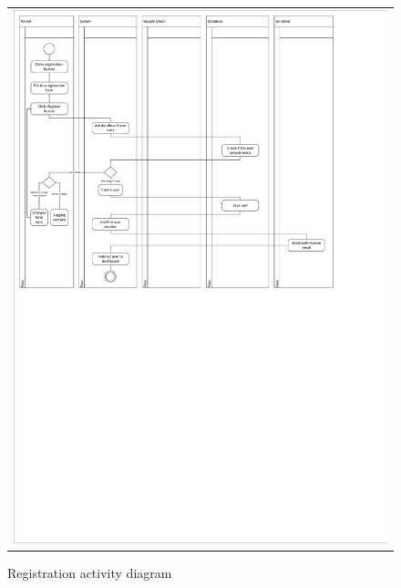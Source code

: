 \documentclass{sprawozdanie-agh}
\begin{document}
			\begin{figure}[H]
				\centering
				\begin{tabular}{c}
					\includegraphics[width=.95\textwidth]{cropped_Registration_Activity_Diagram} 
				\end{tabular}
			\caption{Registration activity diagram}
			\end{figure}
\end{document}
